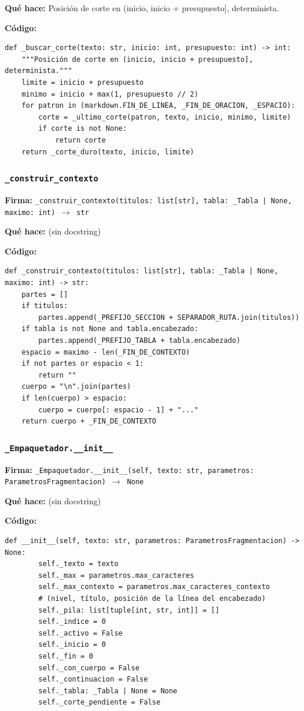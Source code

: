 \documentclass[11pt,a4paper]{article}
\begin{document}
\textbf{Qué hace:} Posición de corte en (inicio, inicio + presupuesto], determinista.

\textbf{Código:}
\begin{lstlisting}
def _buscar_corte(texto: str, inicio: int, presupuesto: int) -> int:
    """Posición de corte en (inicio, inicio + presupuesto], determinista."""
    limite = inicio + presupuesto
    minimo = inicio + max(1, presupuesto // 2)
    for patron in (markdown.FIN_DE_LINEA, _FIN_DE_ORACION, _ESPACIO):
        corte = _ultimo_corte(patron, texto, inicio, minimo, limite)
        if corte is not None:
            return corte
    return _corte_duro(texto, inicio, limite)
\end{lstlisting}

\subsubsection*{\texttt{\_construir\_contexto}}
\textbf{Firma:} \texttt{\_construir\_contexto(titulos: list[str], tabla: \_Tabla | None, maximo: int) $\rightarrow$ str}

\textbf{Qué hace:} (sin docstring)

\textbf{Código:}
\begin{lstlisting}
def _construir_contexto(titulos: list[str], tabla: _Tabla | None, maximo: int) -> str:
    partes = []
    if titulos:
        partes.append(_PREFIJO_SECCION + SEPARADOR_RUTA.join(titulos))
    if tabla is not None and tabla.encabezado:
        partes.append(_PREFIJO_TABLA + tabla.encabezado)
    espacio = maximo - len(_FIN_DE_CONTEXTO)
    if not partes or espacio < 1:
        return ""
    cuerpo = "\n".join(partes)
    if len(cuerpo) > espacio:
        cuerpo = cuerpo[: espacio - 1] + "..."
    return cuerpo + _FIN_DE_CONTEXTO
\end{lstlisting}

\subsubsection*{\texttt{\_Empaquetador.\_\_init\_\_}}
\textbf{Firma:} \texttt{\_Empaquetador.\_\_init\_\_(self, texto: str, parametros: ParametrosFragmentacion) $\rightarrow$ None}

\textbf{Qué hace:} (sin docstring)

\textbf{Código:}
\begin{lstlisting}
def __init__(self, texto: str, parametros: ParametrosFragmentacion) -> None:
        self._texto = texto
        self._max = parametros.max_caracteres
        self._max_contexto = parametros.max_caracteres_contexto
        # (nivel, título, posición de la línea del encabezado)
        self._pila: list[tuple[int, str, int]] = []
        self._indice = 0
        self._activo = False
        self._inicio = 0
        self._fin = 0
        self._con_cuerpo = False
        self._continuacion = False
        self._tabla: _Tabla | None = None
        self._corte_pendiente = False
\end{lstlisting}
\end{document}
